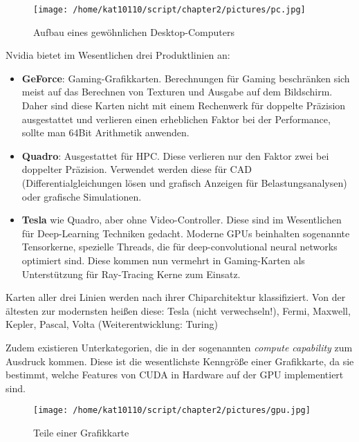 		\begin{figure}[h]
			\centering
    		\texttt{[image: /home/kat10110/script/chapter2/pictures/pc.jpg]}
    		\caption[Desktop PC]{Aufbau eines gew\"ohnlichen Desktop-Computers}
    		\label{2:gpucpu}
		\end{figure}
		
		Nvidia bietet im Wesentlichen drei Produktlinien an:
		\begin{itemize}
		\item \textbf{GeForce}: Gaming-Grafikkarten. Berechnungen für Gaming beschränken sich meist auf das Berechnen von Texturen und Ausgabe auf dem Bildschirm. Daher sind diese Karten nicht mit einem Rechenwerk für doppelte Präzision ausgestattet und verlieren einen erheblichen Faktor bei der Performance, sollte man 64Bit Arithmetik anwenden.
		\item \textbf{Quadro}: Ausgestattet für HPC. Diese verlieren nur den Faktor zwei bei doppelter Präzision. Verwendet werden diese für CAD (Differentialgleichungen lösen und grafisch Anzeigen für Belastungsanalysen) oder grafische Simulationen.
		
		\item \textbf{Tesla} wie Quadro, aber ohne Video-Controller. Diese sind im Wesentlichen für Deep-Learning Techniken gedacht. Moderne GPUs beinhalten sogenannte Tensorkerne, spezielle Threads, die für deep-convolutional neural networks optimiert sind. Diese kommen nun vermehrt in Gaming-Karten als Unterstützung für Ray-Tracing Kerne zum Einsatz.
		\end{itemize}		 		
		
        Karten aller drei Linien werden nach ihrer Chiparchitektur klassifiziert. Von der ältesten zur modernsten heißen diese: Tesla (nicht verwechseln!), Fermi, Maxwell, Kepler, Pascal, Volta (Weiterentwicklung: Turing)
        
        Zudem existieren Unterkategorien, die in der sogenannten \textit{\gls{compute capability}} zum Ausdruck kommen. Diese ist die wesentlichste Kenngröße einer Grafikkarte, da sie bestimmt, welche Features von CUDA in Hardware auf der GPU implementiert sind.		
		
        \begin{figure}[h]
			\centering
    		\texttt{[image: /home/kat10110/script/chapter2/pictures/gpu.jpg]}
    		\caption[Grafikkarte]{Teile einer Grafikkarte}
    		\label{2:graka}
		\end{figure}
		
